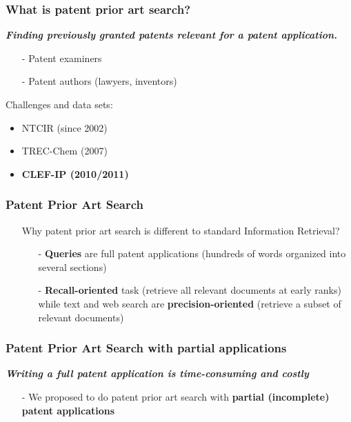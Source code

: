 \documentclass[xcolor=x11names,compress]{beamer}
\renewcommand{\(}{\begin{columns}}
\renewcommand{\)}{\end{columns}}
\newcommand{\<}[1]{\begin{column}{#1}}
\renewcommand{\>}{\end{column}}
\begin{document}
\begin{frame}
\frametitle{What is patent prior art search?}
{\color{DeepSkyBlue4}\textit{\textbf{Finding previously granted patents relevant for a patent application.}}}

\begin{itemize}
\item[-] Patent examiners
\item[-] Patent authors (lawyers, inventors)
\item[]
\end{itemize}


Challenges and data sets:
\begin{itemize}
\item NTCIR (since 2002)
\item TREC-Chem (2007)
\item \textbf{CLEF-IP (2010/2011)}
\end{itemize}
\end{frame}



\begin{frame}
\frametitle{Patent Prior Art Search}
\begin{itemize}
\item[] Why patent prior art search is different to standard Information Retrieval?
  \begin{itemize}
  \item[]
  \item[-] \textbf{Queries} are full patent applications (hundreds of words organized into several sections)  	
   \item[]
  \item[-] \textbf{Recall-oriented} task (retrieve all relevant documents at early ranks)
  	while text and web search are \textbf{precision-oriented} (retrieve a subset of relevant documents)
  \end{itemize}
\end{itemize}
\end{frame}



\begin{frame}
\frametitle{Patent Prior Art Search with partial applications}

{\color{DeepSkyBlue4}\textit{\textbf{Writing a full patent application is time-consuming and costly}}}

\begin{itemize}
\item[-] We proposed to do patent prior art search with \textbf{partial (incomplete) patent applications}
\end{itemize}
\end{frame}
\end{document}
